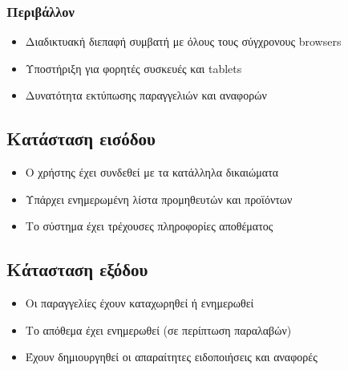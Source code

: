 \documentclass[12pt,a4paper,twoside]{book}
\begin{document}
\subsubsection{Περιβάλλον}
\begin{itemize}
  \item Διαδικτυακή διεπαφή συμβατή με όλους τους σύγχρονους browsers %
  \item Υποστήριξη για φορητές συσκευές και tablets
  \item Δυνατότητα εκτύπωσης παραγγελιών και αναφορών
\end{itemize}

\subsection{Κατάσταση εισόδου} %
\begin{itemize}
  \item Ο χρήστης έχει συνδεθεί με τα κατάλληλα δικαιώματα %
  \item Υπάρχει ενημερωμένη λίστα προμηθευτών και προϊόντων
  \item Το σύστημα έχει τρέχουσες πληροφορίες αποθέματος
\end{itemize}

\subsection{Κάτασταση εξόδου} %
\begin{itemize}
  \item Οι παραγγελίες έχουν καταχωρηθεί ή ενημερωθεί
  \item Το απόθεμα έχει ενημερωθεί (σε περίπτωση παραλαβών)
  \item Έχουν δημιουργηθεί οι απαραίτητες ειδοποιήσεις και αναφορές %
\end{itemize}


\end{document}
